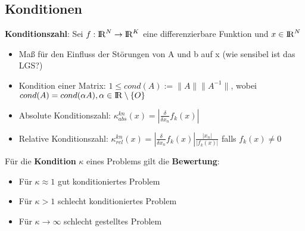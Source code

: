 \documentclass[10pt,a4paper]{article}
\def\realnumbers{{\rm I\!R}}
\newcommand{\norm}[1]{\lVert#1\rVert}
\begin{document}
	\subsection{Konditionen}
	\textbf{Konditionszahl}:
	Sei $f: \realnumbers^N \rightarrow \realnumbers^K$ eine differenzierbare Funktion und $x \in \realnumbers^N$
	\begin{itemize}
		\item Maß für den Einfluss der Störungen von A und b auf x (wie sensibel ist das LGS?)
		\item Kondition einer Matrix: $1 \leq cond(A) := \norm{A}\norm{A^{-1}}$, wobei $cond(A) = cond(\alpha A), \alpha\in\realnumbers\setminus\{O\}$
		\item Absolute Konditionszahl: $\kappa^{kn}_{abs}(x) = |\frac{\delta}{\delta x_n}f_k(x)|$
		\item Relative Konditionszahl: $\kappa^{kn}_{rel}(x) = |\frac{\delta}{\delta x_n}f_k(x)| \frac{|x_n|}{|f_k(x)|}$ falls $f_k(x) \neq 0$
	\end{itemize}
        Für die \textbf{Kondition} $\kappa$ eines Problems gilt die \textbf{Bewertung}:
        \begin{itemize}
                \item Für $\kappa \approx 1$ gut konditioniertes Problem
                \item Für $\kappa > 1$ schlecht konditioniertes Problem
                \item Für $\kappa \rightarrow \infty$ schlecht gestelltes Problem
        \end{itemize}

    \newpage
\end{document}
